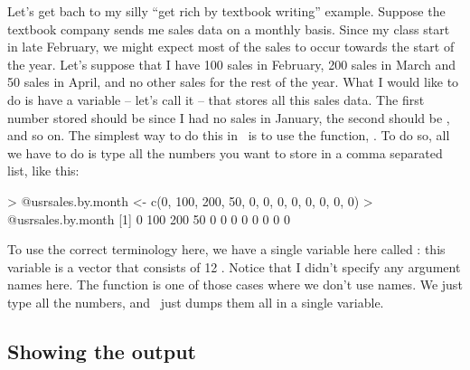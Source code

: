 Let's get bach to my silly ``get rich by textbook writing'' example. Suppose the textbook company sends me sales data on a monthly basis. Since my class start in late February, we might expect most of the sales to occur towards the start of the year. Let's suppose that I have 100 sales in February, 200 sales in March and 50 sales in April, and no other sales for the rest of the year. What I would like to do is have a variable -- let's call it  -- that stores all this sales data. The first number stored should be  since I had no sales in January, the second should be , and so on. The simplest way to do this in \R\ is to use the  function, . To do so, all we have to do is type all the numbers you want to store in a comma separated list, like this:
\begin{rblock1}
> @usr{sales.by.month <- c(0, 100, 200, 50, 0, 0, 0, 0, 0, 0, 0, 0)}
> @usr{sales.by.month}
 [1]   0 100 200  50   0   0   0   0   0   0   0   0
\end{rblock1}
To use the correct terminology here, we have a single variable here called : this variable is a vector that consists of 12 . 
Notice that I didn't specify any argument names here. The  function is one of those cases where we don't use names. We just type all the numbers, and \R\ just dumps them all in a single variable.





\subsection{Showing the output}

